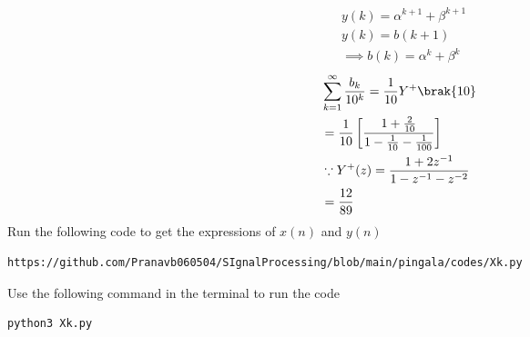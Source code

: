 \documentclass[journal,12pt,twocolumn]{IEEEtran}
\renewcommand\thesection{\arabic{section}}
\begin{document}
\begin{enumerate}[label=\thesection.\arabic*,ref=\thesection.\theenumi]
\begin{align}
&y(k)=\alpha^{k+1}+\beta^{k+1}\\
&y(k)=b(k+1)\\
&\implies b(k)=\alpha^{k}+\beta^{k}
\end{align}
\begin{align}
&\sum_{k=1}^{\infty}\frac{b_k}{10^k} =\frac{1}{10}Y^{+}\brak{{10}}\\
&=\frac{1}{10}\left[\frac{1+\frac{2}{10}}{1-\frac{1}{10}-\frac{1}{100}}\right]\\
&\because Y^{+}(z)=\frac{1+2z^{-1}}{1-z^{-1}-z^{-2}}\\
&=\frac{12}{89}
\end{align}
Run the following code to get the expressions of $x(n)$ and $y(n)$
\begin{lstlisting}
https://github.com/Pranavb060504/SIgnalProcessing/blob/main/pingala/codes/Xk.py
\end{lstlisting}
Use the following command in the terminal to run the code
\begin{lstlisting}
python3 Xk.py
\end{lstlisting}
\end{enumerate}
\end{document}
